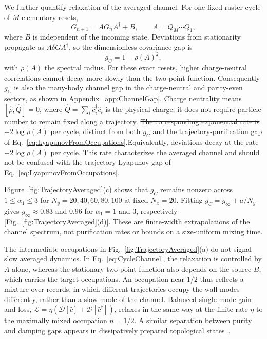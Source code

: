\documentclass[aps,prb,10pt,twocolumn,superscriptaddress,longbibliography,floatfix]{revtex4-2}
\newcommand{\mc}[1]{\mathcal{#1}}
\newcommand{\claudeadd}[1]{{\color{orange}#1}}
\newcommand{\claudedel}[1]{{\color{orange}\sout{#1}}}
\begin{document}
{\color{blue}
We further quantify relaxation of the averaged channel. For one fixed raster cycle of $M$ elementary resets,
\begin{equation}
 \overline G_{n+1}=A\overline G_nA^\dagger+B,\qquad A=Q_M\cdots Q_1,
 \label{eq:CycleChannel}
\end{equation}
where $B$ is independent of the incoming state. Deviations from stationarity propagate as $A\delta G A^\dagger$, so the dimensionless covariance gap is
\begin{equation}
 g_C=1-\rho(A)^2,
 \label{eq:ChannelGap}
\end{equation}
with $\rho(A)$ the spectral radius. For these exact resets, higher charge-neutral correlations cannot decay more slowly than the two-point function. Consequently $g_C$ is also the many-body channel gap in the charge-neutral and parity-even sectors, as shown in Appendix~\ref{app:ChannelGap}. Charge neutrality means $[\hat\rho,\hat Q]=0$, where $\hat Q=\sum_i\hat c_i^\dagger\hat c_i$ is the physical charge; it does not require particle number to remain fixed along a trajectory. \claudedel{The corresponding exponential rate is $-2\log\rho(A)$ per cycle, distinct from both $g_C$ and the trajectory-purification gap of Eq.~\eqref{eq:LyapunovFromOccupations}.}\claudeadd{Equivalently, deviations decay at the rate $-2\log\rho(A)$ per cycle. This rate characterizes the averaged channel and should not be confused with the trajectory Lyapunov gap of Eq.~\eqref{eq:LyapunovFromOccupations}.}

Figure~\ref{fig:TrajectoryAveraged}(c) shows that $g_C$ remains nonzero across $1\leq\alpha_1\leq3$ for $N_y=20,40,60,80,100$ at fixed $N_x=20$. Fitting $g_C=g_\infty+a/N_y$ gives $g_\infty\approx0.83$ and $0.96$ for $\alpha_1=1$ and $3$, respectively [Fig.~\ref{fig:TrajectoryAveraged}(d)]. These are finite-width extrapolations of the channel spectrum, not purification rates or bounds on a size-uniform mixing time.

\claudeadd{The intermediate occupations in Fig.~\ref{fig:TrajectoryAveraged}(a) do not signal slow averaged dynamics. In Eq.~\eqref{eq:CycleChannel}, the relaxation is controlled by $A$ alone, whereas the stationary two-point function also depends on the source $B$, which carries the target occupations. An occupation near $1/2$ thus reflects a mixture over records, in which different trajectories occupy the wall modes differently, rather than a slow mode of the channel. Balanced single-mode gain and loss, $\mc L=\eta(\mc D[\hat c]+\mc D[\hat c^\dagger])$, relaxes in the same way at the finite rate $\eta$ to the maximally mixed occupation $n=1/2$. A similar separation between purity and damping gaps appears in dissipatively prepared topological states~\cite{BardynEtAl2013}.}

}
\end{document}
